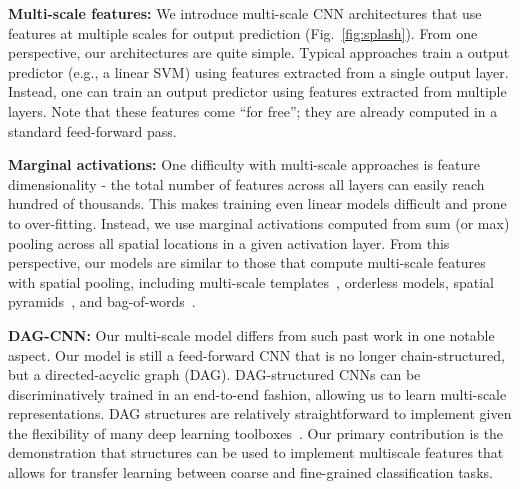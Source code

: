 \documentclass[10pt,twocolumn,letterpaper]{article}
\begin{document}
{\bf Multi-scale features:} We introduce multi-scale CNN architectures that use features at multiple scales for output prediction (Fig.~\ref{fig:splash}). From one perspective, our architectures are quite simple. Typical approaches train a output predictor (e.g., a linear SVM) using features extracted from a single output layer. Instead, one can train an output predictor using features extracted from multiple layers. Note that these features come ``for free''; they are already computed in a standard feed-forward pass. 

{\bf Marginal activations:} One difficulty with multi-scale approaches is feature dimensionality - the total number of features across all layers can easily reach hundred of thousands. This makes training even linear models difficult and prone to over-fitting. Instead, we use marginal activations computed from sum (or max) pooling across all spatial locations in a given activation layer. From this perspective, our models are similar to those that compute multi-scale features with spatial pooling, including multi-scale templates~\cite{felzenszwalb2008discriminatively}, orderless models\cite{Gong14}, spatial pyramids~\cite{spatial_pyramid}, and bag-of-words~\cite{sivic2003video}.

{\bf DAG-CNN:} Our multi-scale model differs from such past work in one notable aspect. Our model is still a feed-forward CNN that is no longer chain-structured, but a directed-acyclic graph (DAG). DAG-structured CNNs can be discriminatively trained in an end-to-end fashion, allowing us to learn multi-scale representations. %
DAG structures are relatively straightforward to implement given the flexibility of many deep learning toolboxes~\cite{vedaldimatconvnet,Caffe,overfeat}. Our primary contribution is the demonstration that structures can be used to implement multiscale features that allows for transfer learning between coarse and fine-grained classification tasks.

\end{document}
